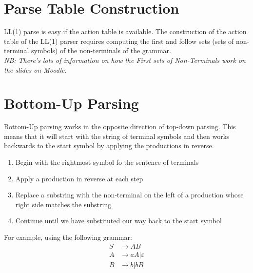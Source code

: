 
\section{Parse Table Construction}
LL(1) parse is easy if the action table is available. The construction of the action table of the LL(1) parser requires computing the first and follow sets (sets of non-terminal symbols) of the non-terminals of the grammar. \\[1em]

\textit{NB: There's lots of information on how the First sets of Non-Terminals work on the slides on Moodle.}

\section{Bottom-Up Parsing}
Bottom-Up parsing works in the opposite direction of top-down parsing. This means that it will start with the string of terminal symbols and then works backwards to the start symbol by applying the productions in reverse. 

\begin{enumerate}
    \item Begin with the rightmost symbol fo the sentence of terminals
    \item Apply a production in reverse at each step
    \item Replace a substring with the non-terminal on the left of a production whose right side matches the substring
    \item Continue until we have substituted our way back to the start symbol
\end{enumerate}

For example, using the following grammar:
\begin{align*}
    S & \rightarrow AB \\
    A & \rightarrow aA | \varepsilon \\
    B & \rightarrow b | bB
\end{align*}

